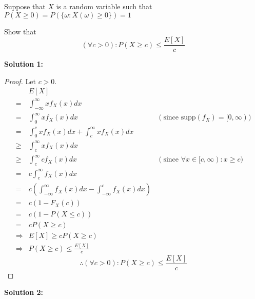 \documentclass{article}
\begin{document}
Suppose that \(X\) is a random variable
such that \(P(X\geq 0) = P(\{\omega : X(\omega)\geq 0\})=1\)

Show that
\[(\forall c>0): P(X\geq c) \leq \frac{E[X]}{c}\]

\textbf{Solution 1:}

\begin{proof}
Let \(c>0\).
\begin{align*}
     & E[X] \\
    =& \int_{-\infty}^\infty x f_X(x)dx \\
    =& \int_0^\infty x f_X(x)dx & (\text{since }\mathrm{supp}(f_X)=[0,\infty)) \\
    =& \int_0^c x f_X(x)dx+\int_c^\infty x f_X(x)dx \\
    \geq& \int_c^\infty x f_X(x)dx \\
    \geq& \int_c^\infty c f_X(x)dx & (\text{since }\forall x\in [c,\infty): x\geq c) \\
    =& c\int_c^\infty f_X(x)dx \\
    =& c\left(\int_{-\infty}^\infty f_X(x)dx-\int_{-\infty}^c f_X(x)dx\right) \\
    =& c(1-F_X(c)) \\
    =& c(1-P(X\leq c)) \\
    =& cP(X\geq c) \\
    \Rightarrow & E[X] \geq c P(X\geq c) \\
    \Rightarrow & P(X\geq c) \leq \frac{E[X]}{c}
\end{align*}
\[\therefore (\forall c>0):P(X\geq c) \leq \frac{E[X]}{c}\]
\end{proof}

\textbf{Solution 2:}
\end{document}
